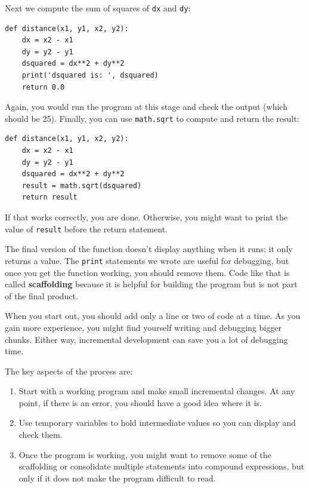 \documentclass[10pt]{book}
\begin{document}
Next we compute the sum of squares of {\tt dx} and {\tt dy}:

\beforeverb
\begin{verbatim}
def distance(x1, y1, x2, y2):
    dx = x2 - x1
    dy = y2 - y1
    dsquared = dx**2 + dy**2
    print('dsquared is: ', dsquared)
    return 0.0
\end{verbatim}
\afterverb
%
Again, you would run the program at this stage and check the output
(which should be 25).
Finally, you can use {\tt math.sqrt} to compute and return the result:


\beforeverb
\begin{verbatim}
def distance(x1, y1, x2, y2):
    dx = x2 - x1
    dy = y2 - y1
    dsquared = dx**2 + dy**2
    result = math.sqrt(dsquared)
    return result
\end{verbatim}
\afterverb
%
If that works correctly, you are done.  Otherwise, you might
want to print the value of {\tt result} before the return
statement.

The final version of the function doesn't display anything when it
runs; it only returns a value.  The {\tt print} statements we wrote
are useful for debugging, but once you get the function working, you
should remove them.  Code like that is called {\bf scaffolding}
because it is helpful for building the program but is not part of the
final product.


When you start out, you should add only a line or two of code at a
time.  As you gain more experience, you might find yourself writing
and debugging bigger chunks.  Either way, incremental development
can save you a lot of debugging time.

The key aspects of the process are:

\begin{enumerate}

\item Start with a working program and make small incremental changes. 
At any point, if there is an error, you should have a good idea
where it is.

\item Use temporary variables to hold intermediate values so you can
display and check them.

\item Once the program is working, you might want to remove some of
the scaffolding or consolidate multiple statements into compound
expressions, but only if it does not make the program difficult to
read.

\end{enumerate}
\end{document}
